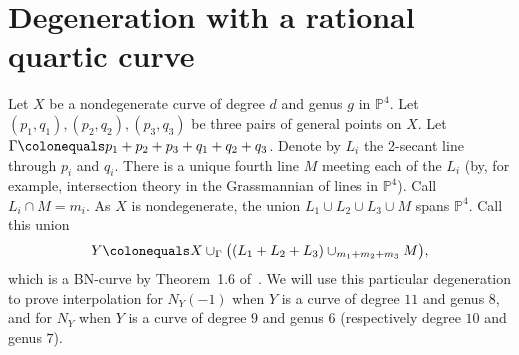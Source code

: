 \documentclass[11pt]{amsart}
\newcommand{\pp}{\mathbb{P}}
\theoremstyle{definition}
\theoremstyle{remark}
\begin{document}



\section{Degeneration with a rational quartic curve}\label{quartic}

Let $X$ be a nondegenerate curve of degree $d$ and genus $g$ in $\pp^4$.  Let $(p_1, q_1), (p_2, q_2), (p_3, q_3)$ be three pairs of general points on $X$.  Let $\Gamma \colonequals p_1 + p_2 + p_3 + q_1 + q_2 + q_3$.  Denote by $L_i$ the 2-secant line through $p_i$ and $q_i$.  There is a unique fourth line $M$ meeting each of the $L_i$ (by, for example, intersection theory
in the Grassmannian of lines in $\pp^4$).
Call $L_i \cap M = m_i$.  As $X$ is nondegenerate, the union $L_1 \cup L_2 \cup L_3 \cup M$ spans $\pp^4$.  Call this union 
\[Y \colonequals X \cup_\Gamma \big((L_1 +L_2 +L_3) \cup_{m_1 + m_2 + m_3} M\big),\]
 which is a BN-curve by Theorem~1.6 of~\cite{rbn}.
We will use this particular degeneration to prove interpolation for $N_Y(-1)$ when $Y$ is a curve of degree $11$ and genus $8$, and for $N_Y$ when $Y$ is a curve of degree $9$ and genus $6$ (respectively degree $10$ and genus $7$).

\end{document}
